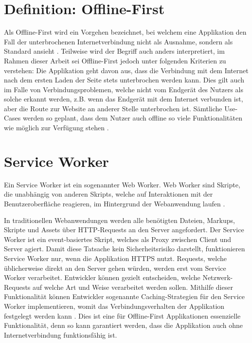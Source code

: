 \documentclass[a4paper, 12pt]{scrreprt}
\begin{document}
\section{Definition: Offline-First}\label{sec:DefinitionOfflineFirst}
Als Offline-First wird ein Vorgehen bezeichnet, bei welchem eine Applikation den Fall der unterbrochenen Internetverbindung nicht als Ausnahme, sondern als Standard ansieht \autocite{OnlineGoogleProgressiveWebApps}. Teilweise wird der Begriff auch anders interpretiert, im Rahmen dieser Arbeit sei Offline-First jedoch unter folgenden Kriterien zu verstehen: Die Applikation geht davon aus, dass die Verbindung mit dem Internet nach dem ersten Laden der Seite stets unterbrochen werden kann. Dies gilt auch im Falle von Verbindungsproblemen, welche nicht vom Endgerät des Nutzers als solche erkannt werden, z.B. wenn das Endgerät mit dem Internet verbunden ist, aber die Route zur Website an anderer Stelle unterbrochen ist. Sämtliche Use-Cases werden so geplant, dass dem Nutzer auch offline so viele Funktionalitäten wie möglich zur Verfügung stehen \autocite{ArticleDesigningOfflineFirst}. 



\section{Service Worker}
\label{sec:serviceworker}

Ein Service Worker ist ein sogenannter Web Worker. Web Worker sind Skripte, die unabhängig von anderen Skripts, welche auf Interaktionen mit der Benutzeroberfläche reagieren, im Hintergrund der Webanwendung laufen \autocite{OnlineHTTPWorker}.

In traditionellen Webanwendungen werden alle benötigten Dateien, Markups, Skripte und Assets über \ac{HTTP}-Requests an den Server angefordert. Der Service Worker ist ein event-basiertes Skript, welches als Proxy zwischen Client und Server agiert. Damit diese Tatsache kein Sicherheitsrisiko darstellt, funktionieren Service Worker nur, wenn die Applikation \ac{HTTPS} nutzt. Requests, welche üblicherweise direkt an den Server gehen würden, werden erst vom Service Worker verarbeitet. Entwickler können gezielt entscheiden, welche Netzwerk-Requests auf welche Art und Weise verarbeitet werden sollen. Mithilfe dieser Funktionalität können Entwickler sogenannte Caching-Strategien für den Service Worker implementieren, womit das Verbindungsverhalten der Applikation festgelegt werden kann \autocite{OnlineServiceWorkersAnIntroduction}. Dies ist eine für Offline-First Applikationen essenzielle Funktionalität, denn so kann garantiert werden, dass die Applikation auch ohne Internetverbindung funktionsfähig ist. 
\end{document}
